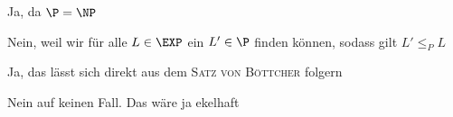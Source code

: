 \begin{quiz}
\item Ja, da $\P=\NP$
\item Nein, weil wir für alle $L\in\EXP$ ein $L'\in\P$ finden können, sodass gilt $L'\leq_P L$
\item Ja, das lässt sich direkt aus dem \textsc{Satz von Böttcher} folgern
\item Nein auf keinen Fall. Das wäre ja ekelhaft
\end{quiz}
